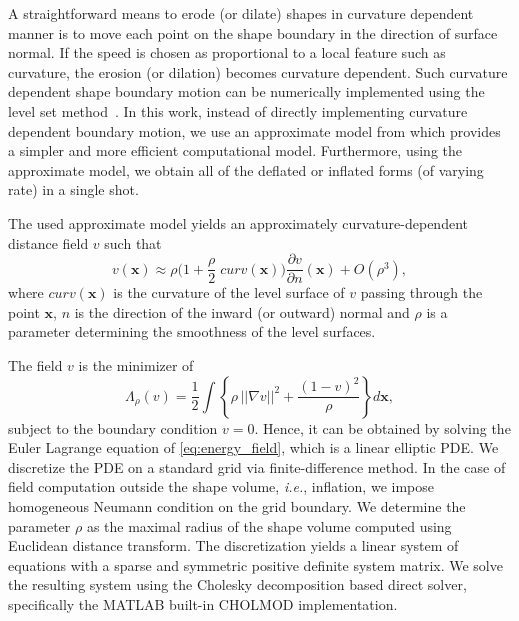 

A straightforward means to erode (or dilate) shapes in curvature dependent manner   is to move each point on the shape boundary in the direction of surface normal. If the speed is chosen as proportional to a local feature such as curvature, the erosion (or dilation)  becomes curvature dependent.
Such curvature dependent shape boundary motion can be numerically implemented using the level set method~\cite{osher2006level}.
In this work, instead of directly implementing curvature dependent boundary motion, we use an approximate model from \cite{TSP96} which provides a simpler and more efficient computational model. Furthermore, using the approximate model, we obtain all of the deflated or inflated forms (of varying rate) in a single shot.

The used approximate model yields an approximately curvature-dependent distance field $v$ such that
\begin{equation}
v(\mathbf{x}) \approx \rho \biggl( 1+ \frac{\rho}{2} \; curv(\mathbf{x}) \biggr) \frac{\partial v}{\partial n}(\mathbf{x}) + O\left({\rho^3} \right),
\label{eq:approx_v}
\end{equation}
where $curv(\mathbf{x})$ is the curvature of the level surface of $v$ passing through the point $\mathbf{x}$, $n$ is the direction of the inward (or outward) normal and $\rho$ is a parameter determining the smoothness of the level surfaces.

The field $v$ is the minimizer of
\begin{equation}
\Lambda_{\rho}(v) = \frac{1}{2} \int {\left\{ \rho \, {||\nabla v||}^2 + \frac{\left(1-v\right)^2}{\rho} \right\} d\mathbf{x}},
\label{eq:energy_field}
\end{equation}
subject to the boundary condition $v = 0$. Hence, it can be  obtained by solving the  Euler Lagrange equation of \eqref{eq:energy_field}, which is a linear elliptic PDE. We discretize the PDE on a standard grid via finite-difference method.
In the case of field computation outside the shape volume, \emph{i.e.}, inflation, we impose homogeneous Neumann condition on the grid boundary. We determine the parameter $\rho$ as the maximal radius of the shape volume computed using Euclidean distance transform. The discretization yields a linear system of equations with a sparse and symmetric positive definite system matrix. We solve the resulting system using the Cholesky decomposition based direct solver, specifically the MATLAB built-in CHOLMOD implementation.

